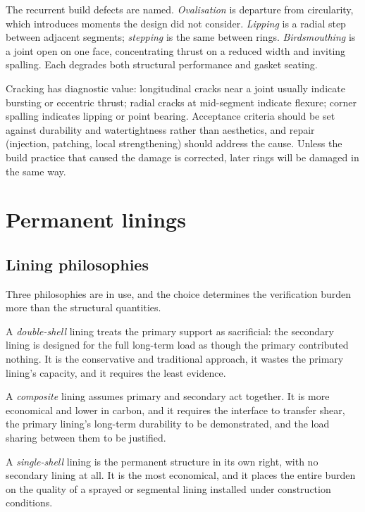 The recurrent build defects are named. \emph{Ovalisation} is departure
from circularity, which introduces moments the design did not consider.
\emph{Lipping} is a radial step between adjacent segments; \emph{stepping} is
the same between rings. \emph{Birdsmouthing} is a joint open on one face,
concentrating thrust on a reduced width and inviting spalling. Each degrades
both structural performance and gasket seating.

Cracking has diagnostic value:
longitudinal cracks near a joint usually indicate bursting or eccentric
thrust; radial cracks at mid-segment indicate flexure; corner spalling
indicates lipping or point bearing. Acceptance criteria should be set against
durability and watertightness rather than aesthetics, and repair (injection,
patching, local strengthening) should address the cause. Unless the build
practice that caused the damage is corrected, later rings will be damaged in
the same way.

\section{Permanent linings}
\label{sec:permanent-linings}

\subsection{Lining philosophies}
\label{sec:lining-philosophies}

Three philosophies are in use, and the choice determines the verification
burden more than the structural quantities.

A \emph{double-shell} lining treats the primary support as sacrificial: the
secondary lining is designed for the full long-term load as though the primary
contributed nothing. It is the conservative and traditional approach, it wastes
the primary lining's capacity, and it requires the least evidence.

A \emph{composite} lining assumes primary and secondary act together. It is
more economical and lower in carbon, and it requires the interface to transfer
shear, the primary lining's long-term durability to be demonstrated, and the
load sharing between them to be justified.

A \emph{single-shell} lining is the permanent structure in its own right, with
no secondary lining at all. It is the most economical, and it places the entire
burden on the quality of a sprayed or segmental lining installed under
construction conditions.

